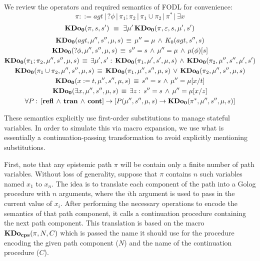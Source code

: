 We review the operators and required semantics of FODL for convenience:\[
\pi::=agt\,|\,?\phi\,|\,\pi_{1};\pi_{2}\,|\,\pi_{1}\cup\pi_{2}\,|\,\pi^{*}\,|\,\exists x\]
 \[
\mathbf{KDo_{0}}(\pi,s,s')\,\,\equiv\,\,\exists\mu'\,\mathbf{KDo_{0}}(\pi,\varepsilon,s,\mu',s')\]
 \begin{gather*}
\mathbf{KDo_{0}}(agt,\mu'',s'',\mu,s)\,\equiv\,\mu''=\mu\,\wedge\, K_{0}(agt,s'',s)\\
\mathbf{KDo_{0}}(?\phi,\mu'',s'',\mu,s)\,\equiv\, s''=s\,\wedge\,\mu''=\mu\,\wedge\,\mu(\phi)[s]\\
\mathbf{KDo_{0}}(\pi_{1};\pi_{2},\mu'',s'',\mu,s)\,\equiv\,\exists\mu',s':\,\mathbf{KDo_{0}}(\pi_{1},\mu',s',\mu,s)\,\wedge\,\mathbf{KDo_{0}}(\pi_{2},\mu'',s'',\mu',s')\\
\mathbf{KDo_{0}}(\pi_{1}\cup\pi_{2},\mu'',s'',\mu,s)\,\equiv\,\mathbf{KDo_{0}}(\pi_{1},\mu'',s'',\mu,s)\,\vee\,\mathbf{KDo_{0}}(\pi_{2},\mu'',s'',\mu,s)\\
\mathbf{KDo_{0}}(x:=t,\mu'',s'',\mu,s)\,\equiv\, s''=s\,\wedge\,\mu''=\mu[x/t]\\
\mathbf{KDo_{0}}(\exists x,\mu'',s'',\mu,s)\,\equiv\,\exists z:\, s''=s\,\wedge\,\mu''=\mu[x/z]\\
\forall P:\,\left[\mathbf{refl}\,\wedge\,\mathbf{tran}\,\wedge\,\mathbf{cont}\right]\rightarrow\left[P(\mu'',s'',\mu,s)\rightarrow\mathbf{KDo_{0}}(\pi^{*},\mu'',s'',\mu,s)\right]\end{gather*}


These semantics explicitly use first-order substitutions to manage
stateful variables. In order to simulate this via macro expansion,
we use what is essentially a continuation-passing transformation to
avoid explicitly mentioning substitutions.

First, note that any epistemic path $\pi$ will be contain only a
finite number of path variables. Without loss of generality, suppose
that $\pi$ contains $n$ such variables named $x_{1}$ to $x_{n}$.
The idea is to translate each component of the path into a Golog procedure
with $n$ arguments, where the $i$th argument is used to pass in
the current value of $x_{i}$. After performing the necessary operations
to encode the semantics of that path component, it calls a continuation
procedure containing the next path component. This translation is
based on the macro $\mathbf{KDo_{cps}}(\pi,N,C)$ which is passed the name it should
use for the procedure encoding the given path component ($N$) and
the name of the continuation procedure ($C$).

